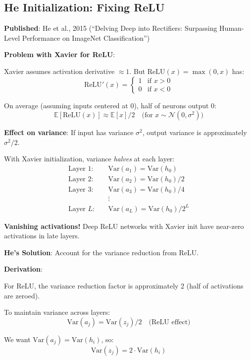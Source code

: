 \subsection{He Initialization: Fixing ReLU}

\textbf{Published}: He et al., 2015 (``Delving Deep into Rectifiers: Surpassing Human-Level Performance on ImageNet Classification'')

\textbf{Problem with Xavier for ReLU}:

Xavier assumes activation derivative $\approx 1$. But $\text{ReLU}(x) = \max(0, x)$ has:
\[
\text{ReLU}'(x) = \begin{cases}
1 & \text{if } x > 0 \\
0 & \text{if } x < 0
\end{cases}
\]

On average (assuming inputs centered at 0), half of neurons output 0:
\[
\mathbb{E}[\text{ReLU}(x)] \approx \mathbb{E}[x]/2 \quad \text{(for } x \sim \mathcal{N}(0, \sigma^2)\text{)}
\]

\textbf{Effect on variance}: If input has variance $\sigma^2$, output variance is approximately $\sigma^2/2$.

With Xavier initialization, variance \textit{halves} at each layer:
\begin{align*}
\text{Layer 1:} \quad & \text{Var}(a_1) = \text{Var}(h_0) \\
\text{Layer 2:} \quad & \text{Var}(a_2) = \text{Var}(h_0)/2 \\
\text{Layer 3:} \quad & \text{Var}(a_3) = \text{Var}(h_0)/4 \\
&\vdots \\
\text{Layer } L: \quad & \text{Var}(a_L) = \text{Var}(h_0)/2^L
\end{align*}

\textbf{Vanishing activations!} Deep ReLU networks with Xavier init have near-zero activations in late layers.

\textbf{He's Solution}: Account for the variance reduction from ReLU.

\textbf{Derivation}:

For ReLU, the variance reduction factor is approximately 2 (half of activations are zeroed).

To maintain variance across layers:
\[
\text{Var}(a_j) = \text{Var}(z_j)/2 \quad \text{(ReLU effect)}
\]

We want $\text{Var}(a_j) = \text{Var}(h_i)$, so:
\[
\text{Var}(z_j) = 2 \cdot \text{Var}(h_i)
\]

